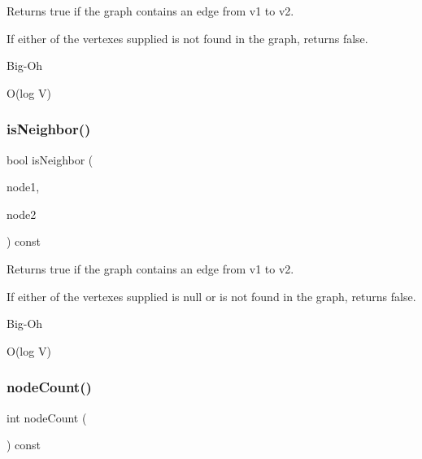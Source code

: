 Returns true if the graph contains an edge from v1 to v2. 

If either of the vertexes supplied is not found in the graph, returns false. \begin{DoxyRefDesc}{Big-\/\+Oh}
\item[\mbox{\hyperlink{BigOh__BigOh000080}{Big-\/\+Oh}}]O(log V) \end{DoxyRefDesc}
\mbox{\label{classGraph_a9e752628a118c4a06a538067c95bbb28}} 
\subsubsection{\texorpdfstring{is\+Neighbor()}{isNeighbor()}\hspace{0.1cm}{\footnotesize\ttfamily [2/2]}}
{\footnotesize\ttfamily bool is\+Neighbor (\begin{DoxyParamCaption}\item[{\mbox{\hyperlink{classVertexGen}{Vertex\+Gen}}$<$ V, E $>$  $\ast$}]{node1,  }\item[{\mbox{\hyperlink{classVertexGen}{Vertex\+Gen}}$<$ V, E $>$  $\ast$}]{node2 }\end{DoxyParamCaption}) const\hspace{0.3cm}{\ttfamily [inherited]}}



Returns true if the graph contains an edge from v1 to v2. 

If either of the vertexes supplied is null or is not found in the graph, returns false. \begin{DoxyRefDesc}{Big-\/\+Oh}
\item[\mbox{\hyperlink{BigOh__BigOh000081}{Big-\/\+Oh}}]O(log V) \end{DoxyRefDesc}
\mbox{\label{classGraph_a5dd1afdb4e1c75fbe51976bf6f70c922}} 
\subsubsection{\texorpdfstring{node\+Count()}{nodeCount()}}
{\footnotesize\ttfamily int node\+Count (\begin{DoxyParamCaption}{ }\end{DoxyParamCaption}) const\hspace{0.3cm}{\ttfamily [inherited]}}



